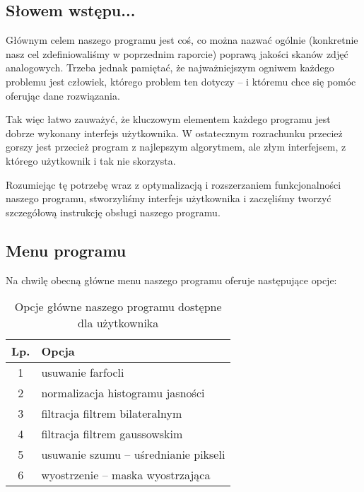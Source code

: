 \documentclass[]{mwart}
\begin{document}
\subsection{Słowem wstępu...}
Głównym celem naszego programu jest coś, co można nazwać
ogólnie (konkretnie nasz cel zdefiniowaliśmy w poprzednim raporcie)
poprawą jakości skanów zdjęć analogowych. Trzeba jednak pamiętać,
że najważniejszym ogniwem każdego problemu jest człowiek, którego
problem ten dotyczy -- i któremu chce się pomóc oferując dane rozwiązania. \newline

Tak więc łatwo zauważyć, że kluczowym elementem każdego programu jest dobrze wykonany
interfejs użytkownika. W ostatecznym rozrachunku przecież gorszy
jest przecież program z najlepszym algorytmem, ale złym interfejsem, z którego użytkownik i tak nie skorzysta. \newline


Rozumiejąc tę potrzebę wraz z optymalizacją i rozszerzaniem funkcjonalności
naszego programu, stworzyliśmy interfejs użytkownika i zaczęliśmy %
tworzyć szczegółową instrukcję obsługi naszego programu.

\subsection{Menu programu}
Na chwilę obecną główne menu naszego programu oferuje następujące opcje:

\begin{table}[h]
    \centering
    \begin{tabular}{|c|l|}
        \hline
        Lp. & Opcja                                 \\ \hline
        1   & usuwanie farfocli                     \\ \hline       %
        2   & normalizacja histogramu jasności      \\ \hline       %
        3   & filtracja filtrem bilateralnym        \\ \hline       %
        4   & filtracja filtrem gaussowskim         \\ \hline       %
        5   & usuwanie szumu -- uśrednianie pikseli \\ \hline       %
        6   & wyostrzenie -- maska wyostrzająca     \\ \hline       %
    \end{tabular}
    \caption{Opcje główne naszego programu dostępne dla użytkownika}
\end{table}
\end{document}
